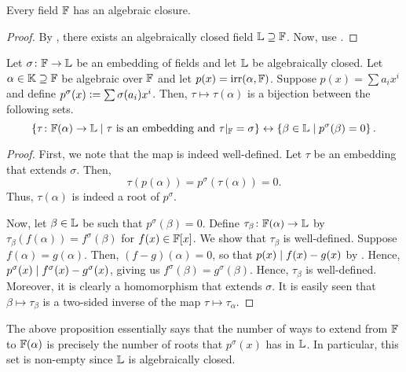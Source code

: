 \begin{cor} \label{cor:existence-of-AC}
    Every field $\mathbb{F}$ has an algebraic closure.
\end{cor}
\begin{proof}
    By , there exists an algebraically closed field $\mathbb{L} \supseteq \mathbb{F}$. Now, use .
\end{proof}

\begin{prop} \label{prop:embedding-extension}
    Let $\sigma \colon \mathbb{F} \to \mathbb{L}$ be an embedding of fields and let $\mathbb{L}$ be algebraically closed. Let $\alpha \in \mathbb{K} \supseteq \mathbb{F}$ be algebraic over $\mathbb{F}$ and let $p(x) = \operatorname{irr}(\alpha, \mathbb{F})$. Suppose $p(x) = \sum a_i x^i$ and define $p^{\sigma}(x) \vcentcolon= \sum \sigma(a_i) x^i$. Then, $\tau \mapsto \tau(\alpha)$ is a bijection between the following sets. 
    \[
        \left\{ \tau \colon \mathbb{F}(\alpha) \to \mathbb{L} \mid \tau \text{ is an embedding and } \tau|_{\mathbb{F}} = \sigma \right\} \leftrightarrow \left\{ \beta \in \mathbb{L} \mid p^{\sigma}(\beta) = 0 \right\}.
    \]
\end{prop}
\begin{proof}
    First, we note that the map is indeed well-defined. Let $\tau$ be an embedding that extends $\sigma$. Then, 
    \[
        \tau(p(\alpha)) = p^{\sigma}(\tau(\alpha)) = 0.
    \]
    Thus, $\tau(\alpha)$ is indeed a root of $p^{\sigma}$.
    
    Now, let $\beta \in \mathbb{L}$ be such that $p^{\sigma}(\beta) = 0$. Define $\tau_{\beta} \colon \mathbb{F}(\alpha) \to \mathbb{L}$ by $\tau_{\beta}(f(\alpha)) = f^{\sigma}(\beta)$ for $f(x) \in \mathbb{F}[x]$. We show that $\tau_{\beta}$ is well-defined. Suppose $f(\alpha) = g(\alpha)$. Then, $(f-g)(\alpha) = 0$, so that $p(x) \mid f(x) - g(x)$ by . Hence, $p^{\sigma}(x) \mid f^{\sigma}(x) - g^{\sigma}(x)$, giving us $f^{\sigma}(\beta) = g^{\sigma}(\beta)$. Hence, $\tau_{\beta}$ is well-defined. Moreover, it is clearly a homomorphism that extends $\sigma$. It is easily seen that $\beta \mapsto \tau_{\beta}$ is a two-sided inverse of the map $\tau \mapsto \tau_{\alpha}$.
\end{proof}

\begin{rem}
    The above proposition essentially says that the number of ways to extend from $\mathbb{F}$ to $\mathbb{F}(\alpha)$ is precisely the number of roots that $p^{\sigma}(x)$ has in $\mathbb{L}$. In particular, this set is non-empty since $\mathbb{L}$ is algebraically closed. 
\end{rem}

